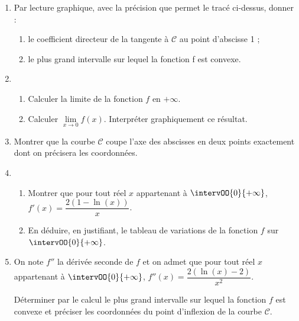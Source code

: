 \begin{enumerate}
	\item Par lecture graphique, avec la précision que permet le tracé ci-dessus, donner :
	\begin{enumerate}
		\item le coefficient directeur de la tangente à $\mathcal{C}$ au point d’abscisse 1 ;
		\item le plus grand intervalle sur lequel la fonction f est convexe.
	\end{enumerate}
	\item 
	\begin{enumerate}
		\item Calculer la limite de la fonction $f$ en $+\infty$.
		\item Calculer $\lim\limits_{x \to 0} f(x)$. Interpréter graphiquement ce résultat.
	\end{enumerate}
	\item Montrer que la courbe $\mathcal{C}$ coupe l’axe des abscisses en deux points exactement dont on précisera les coordonnées.
	\item 
	\begin{enumerate}
		\item Montrer que pour tout réel $x$ appartenant à $\intervOO{0}{+\infty}$, $f'(x)=\dfrac{2(1-\ln(x))}{x}$.
		\item En déduire, en justifiant, le tableau de variations de la fonction $f$ sur  $\intervOO{0}{+\infty}$.
	\end{enumerate}
	\item On note $f''$ la dérivée seconde de $f$ et on admet que pour tout réel $x$ appartenant à $\intervOO{0}{+\infty}$, $f''(x)=\dfrac{2(\ln(x)-2)}{x^2}$.
	
	Déterminer par le calcul le plus grand intervalle sur lequel la fonction $f$ est convexe et préciser les coordonnées du point d’inflexion de la courbe $\mathcal{C}$.
\end{enumerate}
